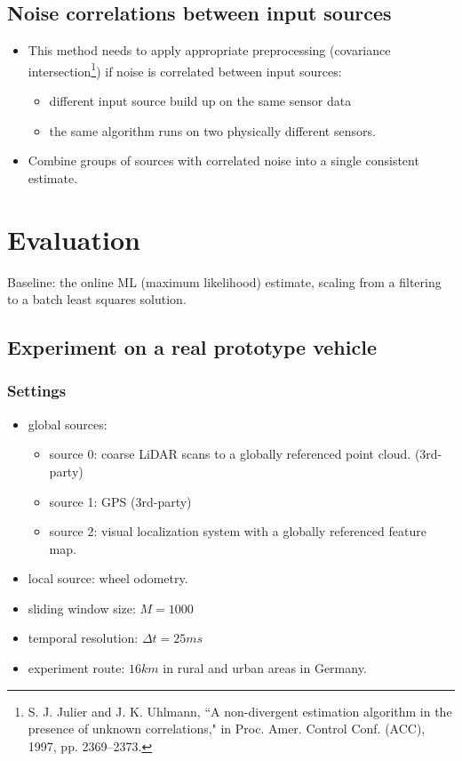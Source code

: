 \documentclass[letterpaper,10pt]{article}
\begin{document}
\subsection{Noise correlations between input sources}

\begin{itemize}
	\item This method needs to apply appropriate preprocessing (covariance intersection\footnote{S. J. Julier and J. K. Uhlmann, ``A non-divergent estimation algorithm in the presence of unknown correlations," in Proc. Amer. Control Conf. (ACC), 1997, pp. 2369–2373.}) if noise is correlated between input sources:
	\begin{itemize}
		\item different input source build up on the same sensor data
		\item the same algorithm runs on two physically different sensors.
	\end{itemize}
	\item Combine groups of sources with correlated noise into a single consistent estimate.
\end{itemize}

\section{Evaluation}

Baseline: the online ML (maximum likelihood) estimate, scaling from a filtering to a batch least squares solution.

\subsection{Experiment on a real prototype vehicle}

\subsubsection{Settings}
\begin{itemize}
	\item global sources:
	\begin{itemize}
		\item source 0: coarse LiDAR scans to a globally referenced point cloud. (3rd-party)
		\item source 1: GPS (3rd-party)
		\item source 2: visual localization system with a globally referenced feature map.
	\end{itemize}
	\item local source: wheel odometry.
	\item sliding window size: $M=1000$
	\item temporal resolution: $\Delta t=25ms$
	\item experiment route: $16km$ in rural and urban areas in Germany.
\end{itemize}
\end{document}
